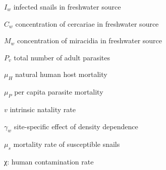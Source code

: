 \documentclass[12pt]{article}
\begin{document}
$I_w$ infected snails in freshwater source

$C_w$ concentration of cercariae in freshwater source

$M_w$  concentration of miracidia in freshwater source

$P_v$ total number of adult parasites

$\mu_H$ natural human host mortality

$\mu_P$ per capita parasite mortality

$v$ intrinsic natality rate

$\gamma_w$ site-specific effect of density dependence

$\mu_s$ mortality rate of susceptible snails







χ: human contamination rate

 
\end{document}
